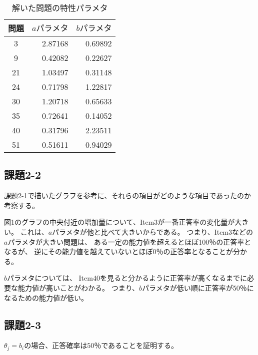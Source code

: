 \documentclass[12pt]{jarticle}
\begin{document}
\begin{table}[htb]
    \begin{center}
        \caption{解いた問題の特性パラメタ}
        \begin{tabular}{|c|r|r|}
            \hline
            問題 & $aパラメタ$ & $bパラメタ$ \\
            \hline
            3    & 2.87168     & 0.69892     \\
            9    & 0.42082     & 0.22627     \\
            21   & 1.03497     & 0.31148     \\
            24   & 0.71798     & 1.22817     \\
            30   & 1.20718     & 0.65633     \\
            35   & 0.72641     & 0.14052     \\
            40   & 0.31796     & 2.23511     \\
            51   & 0.51611     & 0.94029     \\
            \hline
        \end{tabular}
    \end{center}
\end{table}

\clearpage
\subsection{課題2-2}
\begin{shadebox}
    課題2-1で描いたグラフを参考に、それらの項目がどのような項目であったのか考察する。
\end{shadebox}

図1のグラフの中央付近の増加量について、Item3が一番正答率の変化量が大きい。
これは、$a$パラメタが他と比べて大きいからである。
つまり、Item3などの$a$パラメタが大きい問題は、
ある一定の能力値を超えるとほぼ100％の正答率となるが、
逆にその能力値を越えていないとほぼ0％の正答率となることが分かる。

$b$パラメタについては、
Item40を見ると分かるように正答率が高くなるまでに必要な能力値が高いことがわかる。
つまり、$b$パラメタが低い順に正答率が50％になるための能力値が低い。

\subsection{課題2-3}
\begin{shadebox}
    $\theta_j=b_i$の場合、正答確率は$50％$であることを証明する。
\end{shadebox}
\end{document}
